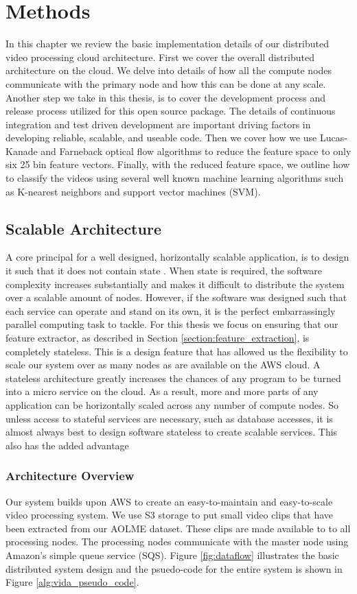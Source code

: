 \chapter{Methods}
In this chapter we review the basic implementation details of our distributed
video processing cloud architecture. First we cover the overall distributed
architecture on the cloud.  We delve into details of how all the compute nodes
communicate with the primary node and how this can be done at any scale. Another
step we take in this thesis,  is to cover the development process and release
process utilized for this open source package. The details of continuous
integration and test driven development are  important driving factors in
developing reliable, scalable, and useable code.  Then we cover how we use
Lucas-Kanade and Farneback optical flow algorithms to reduce the feature space
to only six 25 bin feature vectors. Finally, with the reduced feature space, we
outline how to classify the videos using several well known machine learning
algorithms such as K-nearest neighbors and support vector machines (SVM).

\section{\label{section:distributed_processing}Scalable Architecture}
A core principal for a well designed, horizontally scalable application, is
to design it such that it does not contain state \cite{awsbestpractices}.
When state is required, the software complexity increases substantially and
makes it difficult to distribute the system over a scalable amount of nodes.
However, if the software was designed such that each service can operate and
stand on its own, it is the perfect embarrassingly parallel computing task to
tackle. For this thesis we focus on ensuring that our feature extractor,
as described in Section \ref{section:feature_extraction}, is completely stateless.
This is a design feature that has allowed us the flexibility to scale our
system over as many nodes as are available on the AWS cloud. A stateless architecture
greatly increases the chances of any program to be turned into a micro service
on the cloud. As a result, more and more parts of any application can  be horizontally scaled
across any number of compute nodes. So unless access to stateful services are
necessary, such as database accesses, it is almost always best to design
software stateless to create scalable services. This also has the added advantage


\subsection{\label{subsection:architecture_overview}Architecture Overview}
Our system builds upon AWS to create an easy-to-maintain and easy-to-scale
video processing system. We use S3 storage to put small video clips that
have been extracted from our AOLME dataset. These clips are made available to
to all processing nodes. The processing nodes communicate with the master
node using Amazon's simple queue service (SQS). Figure \ref{fig:dataflow} illustrates
the basic distributed system design and the psuedo-code for the entire system
is shown in Figure \ref{alg:vida_pseudo_code}.

